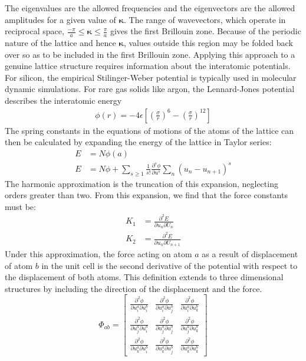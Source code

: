 %
The eigenvalues are the allowed frequencies and the eigenvectors are the allowed amplitudes for a given value of $\pmb{\kappa}$. The range of wavevectors, which operate in reciprocal space,  $\frac{-\pi}{a}\leq \pmb{\kappa}\leq\frac{\pi}{a}$ gives the first Brillouin zone. Because of the periodic nature of the lattice and hence $\pmb{\kappa}$, values outside this region may be folded back over so as to be included in the first Brillouin zone.
Applying this approach to a genuine lattice structure requires information about the interatomic potentials. For silicon, the empirical Stilinger-Weber potential is typically used in molecular dynamic simulations. For rare gas solids like argon, the Lennard-Jones potential describes the interatomic energy
\begin{align}
	\phi(r)=-4\epsilon[(\frac{\sigma}{r})^6-(\frac{\sigma}{r})^{12}]	
\end{align}
The spring constants in the equations of motions of the atoms of the lattice can then be calculated by expanding the energy of the lattice in Taylor series:
%
\begin{equation}\label{EQ:eng_exp}
\begin{split}
	E&=N\phi(a)\\
	E&=N\phi+\sum_{s\geq1}\frac{1}{s!}\frac{\partial^s\phi}{\partial u^s}\sum_n(u_n-u_{n+1})^s
\end{split}
\end{equation}
%
The harmonic approximation is the truncation of this expansion, neglecting orders greater than two. From this expansion, we find that the force constants must be:
%
\begin{equation}
\begin{split}
	K_1&=\frac{\partial^2 E}{\partial u_n\partial U_{n}}\\
	K_2&=\frac{\partial^2 E}{\partial u_n\partial U_{n+1}}
\end{split}
\end{equation}
%
Under this approximation, the force acting on atom $a$ as a result of displacement of atom $b$ in the unit cell is the second derivative of the potential with respect to the displacement of both atoms. This definition extends to three dimensional structures by including the direction of the displacement and the force.
%
\begin{equation}
\Phi_{ab}=
\begin{bmatrix}
  \frac{\partial^2 \phi}{\partial u^a_i\partial u^b_i} & \frac{\partial^2 \phi}{\partial u^a_i\partial u^b_j} &\frac{\partial^2 \phi}{\partial u^a_i\partial u^b_k}\\
  \frac{\partial^2 \phi}{\partial u^a_j\partial u^b_i} & \frac{\partial^2 \phi}{\partial u^a_j\partial u^b_j} &\frac{\partial^2 \phi}{\partial u^a_j\partial u^b_k}\\
\frac{\partial^2 \phi}{\partial u^a_k\partial u^b_i} & \frac{\partial^2 \phi}{\partial u^a_k\partial u^b_j} &\frac{\partial^2 \phi}{\partial u^a_k\partial u^b_k}
 \end{bmatrix}
\end{equation}

